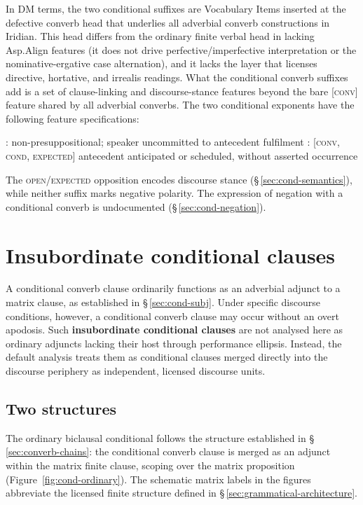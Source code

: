 In DM terms, the two conditional suffixes are Vocabulary Items inserted at the
defective converb head that underlies all adverbial converb constructions in
Iridian. This head differs from the ordinary finite verbal head in lacking
Asp.Align features (it does not drive perfective/imperfective interpretation or
the nominative-ergative case alternation), and it lacks the 
layer that licenses directive, hortative, and irrealis readings. What the
conditional converb suffixes add is a set of clause-linking and discourse-stance
features beyond the bare \textsc{[conv]} feature shared by all adverbial
converbs. The two conditional exponents have the following feature specifications:

\pex
\a {}: 
\hfill non-presuppositional; speaker uncommitted to antecedent fulfilment
\a {}: [\textsc{conv}, \textsc{cond}, \textsc{expected}]
\hfill antecedent anticipated or scheduled, without asserted occurrence
\xe

The \textsc{open}/\textsc{expected} opposition encodes discourse stance
(§\,\ref{sec:cond-semantics}), while neither suffix marks negative polarity.
The expression of negation with a conditional converb is undocumented
(§\,\ref{sec:cond-negation}).

\section{Insubordinate conditional clauses}\label{sec:cond-insub}

A conditional converb clause ordinarily functions as an adverbial adjunct to a
matrix clause, as established in §\,\ref{sec:cond-subj}. Under specific
discourse conditions, however, a conditional converb clause may occur without an
overt apodosis. Such \textbf{insubordinate conditional clauses} are not analysed
here as ordinary adjuncts lacking their host through performance ellipsis.
Instead, the default analysis treats them as conditional clauses merged directly
into the discourse periphery as independent, licensed discourse units.

\subsection{Two structures}

The ordinary biclausal conditional follows the structure established in
§\,\ref{sec:converb-chains}: the conditional converb clause is merged as an
adjunct within the matrix finite clause, scoping over the matrix
proposition (Figure~\ref{fig:cond-ordinary}). The schematic matrix labels
in the figures abbreviate the licensed finite structure defined in
§\,\ref{sec:grammatical-architecture}.

